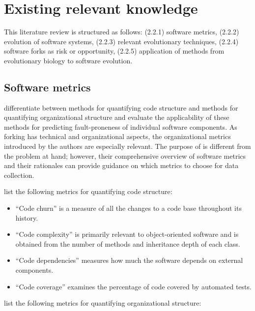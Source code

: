 \section{Existing relevant knowledge}

This literature review is structured as follows: (2.2.1) software metrics, (2.2.2) evolution of software systems, (2.2.3) relevant evolutionary techniques, (2.2.4) software forks as risk or opportunity, (2.2.5) application of methods from evolutionary biology to software evolution.

\subsection{Software metrics}
\citet{Nagappan2008a} differentiate between methods for quantifying code structure and methods for quantifying organizational structure and evaluate the applicability of these methods for predicting fault-proneness of individual software components. As forking has technical and organizational aspects, the organizational metrics introduced by the authors are especially relevant. The purpose of \citet{Nagappan2008a} is different from the problem at hand; however, their comprehensive overview of software metrics and their rationales can provide guidance on which metrics to choose for data collection.

\noindent
\citet{Nagappan2008a} list the following metrics for quantifying code structure:

\begin{itemize}
  \item{“Code churn” is a measure of all the changes to a code base throughout its history.}
  \item{“Code complexity” is primarily relevant to object-oriented software and is obtained from the number of methods and inheritance depth of each class.}
  \item{“Code dependencies” measures how much the software depends on external components.}
  \item{“Code coverage” examines the percentage of code covered by automated tests.}
\end{itemize}

\noindent
\citet{Nagappan2008a} list the following metrics for quantifying organizational structure:

